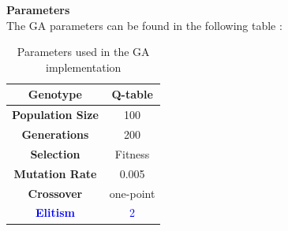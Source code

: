 \textbf{Parameters}\\
The GA parameters can be found in the following table :
\begin{table}[htb]%
	\centering
	\caption{Parameters used in the GA implementation}
	\label{tab:GA_parameters}
	\begin{tabular}{|S|S|} 		%
		
		\hline
		{\textbf{Genotype}} &  {Q-table} \\
		\hline
		{\textbf{Population Size}} & {100} \\
		\hline
		{\textbf{Generations}} & {200} \\
		\hline
		{\textbf{Selection}}  & {Fitness} \\
		\hline
		{\textbf{Mutation Rate}} & {0.005} \\
		\hline
		{\textbf{Crossover}}& {one-point} \\
		\hline
		{\textbf{\textcolor{blue}{Elitism}}}& {\textcolor{blue}{2} } \\
		\hline

	\end{tabular}
\end{table}


